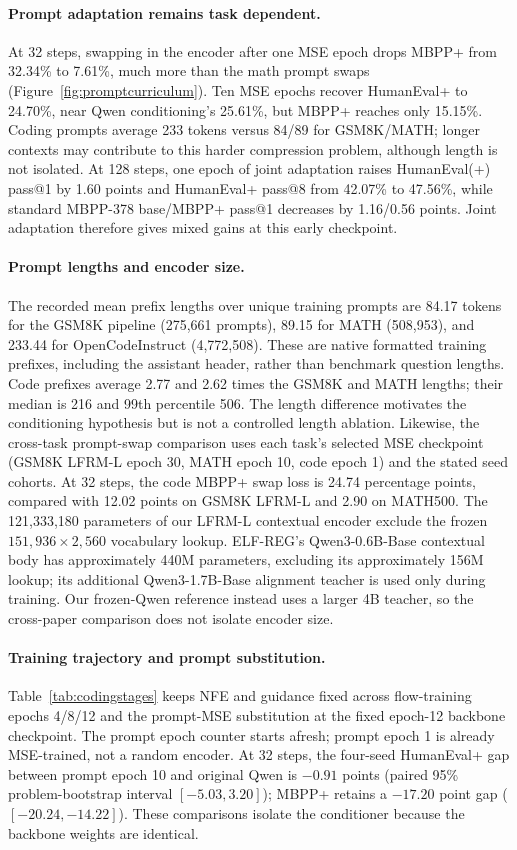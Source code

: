 \documentclass{article}
\begin{document}
\paragraph{Prompt adaptation remains task dependent.}
At 32 steps, swapping in the encoder after one MSE epoch drops MBPP+ from 32.34\% to 7.61\%, much more than the math prompt swaps (Figure~\ref{fig:promptcurriculum}). Ten MSE epochs recover HumanEval+ to 24.70\%, near Qwen conditioning's 25.61\%, but MBPP+ reaches only 15.15\%. Coding prompts average 233 tokens versus 84/89 for GSM8K/MATH; longer contexts may contribute to this harder compression problem, although length is not isolated. At 128 steps, one epoch of joint adaptation raises HumanEval(+) pass@1 by 1.60 points and HumanEval+ pass@8 from 42.07\% to 47.56\%, while standard MBPP-378 base/MBPP+ pass@1 decreases by 1.16/0.56 points. Joint adaptation therefore gives mixed gains at this early checkpoint.

\paragraph{Prompt lengths and encoder size.}
The recorded mean prefix lengths over unique training prompts are 84.17 tokens for the GSM8K pipeline (275,661 prompts), 89.15 for MATH (508,953), and 233.44 for OpenCodeInstruct (4,772,508). These are native formatted training prefixes, including the assistant header, rather than benchmark question lengths. Code prefixes average 2.77 and 2.62 times the GSM8K and MATH lengths; their median is 216 and 99th percentile 506. The length difference motivates the conditioning hypothesis but is not a controlled length ablation. Likewise, the cross-task prompt-swap comparison uses each task's selected MSE checkpoint (GSM8K LFRM-L epoch 30, MATH epoch 10, code epoch 1) and the stated seed cohorts. At 32 steps, the code MBPP+ swap loss is 24.74 percentage points, compared with 12.02 points on GSM8K LFRM-L and 2.90 on MATH500. The 121,333,180 parameters of our LFRM-L contextual encoder exclude the frozen $151{,}936\times2{,}560$ vocabulary lookup. ELF-REG's Qwen3-0.6B-Base contextual body has approximately 440M parameters, excluding its approximately 156M lookup; its additional Qwen3-1.7B-Base alignment teacher is used only during training. Our frozen-Qwen reference instead uses a larger 4B teacher, so the cross-paper comparison does not isolate encoder size.

\paragraph{Training trajectory and prompt substitution.}
Table~\ref{tab:codingstages} keeps NFE and guidance fixed across flow-training epochs 4/8/12 and the prompt-MSE substitution at the fixed epoch-12 backbone checkpoint. The prompt epoch counter starts afresh; prompt epoch 1 is already MSE-trained, not a random encoder. At 32 steps, the four-seed HumanEval+ gap between prompt epoch 10 and original Qwen is $-0.91$ points (paired 95\% problem-bootstrap interval $[-5.03,3.20]$); MBPP+ retains a $-17.20$ point gap ($[-20.24,-14.22]$). These comparisons isolate the conditioner because the backbone weights are identical.
\end{document}
